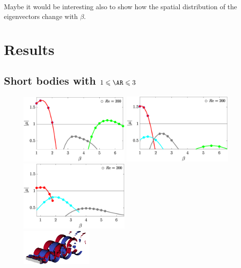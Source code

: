 \documentclass{jfm}
\begin{document}
Maybe it would be interesting also to show how the spatial distribution of the eigenvectors change with $\beta$.

\section{Results}

\subsection{Short bodies with $1 \le \AR \le 3$}

\begin{figure}
  \centering
  \includegraphics[width=0.49\textwidth]{./fig/AR1s/multipliers_AR1.eps}
  \includegraphics[width=0.49\textwidth]{./fig/AR1s/multipliers_AR1p25.eps}
  \includegraphics[width=0.49\textwidth]{./fig/AR1s/multipliers_AR1p5.eps} \\
  \includegraphics[width=0.32\textwidth]{./fig/AR1s/Floqetmode_beta_1p2_Re200_AR1_A.png}

\end{figure}
\end{document}
